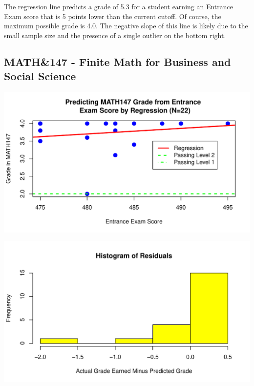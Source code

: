 \documentclass[twoside]{article}\usepackage[]{graphicx}\usepackage[]{color}
\makeatletter
\def\maxwidth{ %
  \ifdim\Gin@nat@width>\linewidth
    \linewidth
  \else
    \Gin@nat@width
  \fi
}
\newenvironment{knitrout}{}{} %
\makeatother
\begin{document}
The regression line predicts a grade of 5.3 for a student earning an Entrance Exam score that is 5 points lower than the current cutoff.  Of course, the maximum possible grade is  4.0.  The negative slope of this line is likely due to the small sample size and the presence of a single outlier on the bottom right.

\newpage
\subsection{MATH\&147 - Finite Math for Business and Social Science}


%

\begin{knitrout}
\color{fgcolor}
\includegraphics[width=\maxwidth]{figure/147regressiongraph-1} 

\end{knitrout}

\begin{knitrout}
\color{fgcolor}
\includegraphics[width=\maxwidth]{figure/147residualsplot-1} 

\end{knitrout}
\end{document}
